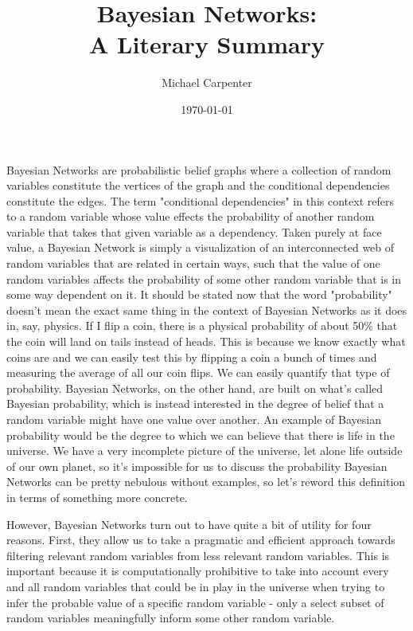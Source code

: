 \documentclass{article}
\title{Bayesian Networks: \\ A Literary Summary}
\author{Michael Carpenter}
\date{\today}
\begin{document}
\maketitle

Bayesian Networks are probabilistic belief graphs where a collection of random variables constitute the vertices of the graph and the conditional dependencies constitute the edges. The term "conditional dependencies" in this context refers to a random variable whose value effects the probability of another random variable that takes that given variable as a dependency. Taken purely at face value, a Bayesian Network is simply a visualization of an interconnected web of random variables that are related in certain ways, such that the value of one random variables affects the probability of some other random variable that is in some way dependent on it. It should be stated now that the word "probability" doesn't mean the exact same thing in the context of Bayesian Networks as it does in, say, physics. If I flip a coin, there is a physical probability of about 50\% that the coin will land on tails instead of heads. This is because we know exactly what coins are and we can easily test this by flipping a coin a bunch of times and measuring the average of all our coin flips. We can easily quantify that type of probability. Bayesian Networks, on the other hand, are built on what's called Bayesian probability, which is instead interested in the degree of belief that a random variable might have one value over another. An example of Bayesian probability would be the degree to which we can believe that there is life in the universe. We have a very incomplete picture of the universe, let alone life outside of our own planet, so it's impossible for us to discuss the probability Bayesian Networks can be pretty nebulous without examples, so let's reword this definition in terms of something more concrete.

However, Bayesian Networks turn out to have quite a bit of utility for four reasons\cite{}. First, they allow us to take a pragmatic and efficient approach towards filtering relevant random variables from less relevant random variables. This is important because it is computationally prohibitive to take into account every and all random variables that could be in play in the universe when trying to infer the probable value of a specific random variable - only a select subset of random variables meaningfully inform some other random variable.
\end{document}
